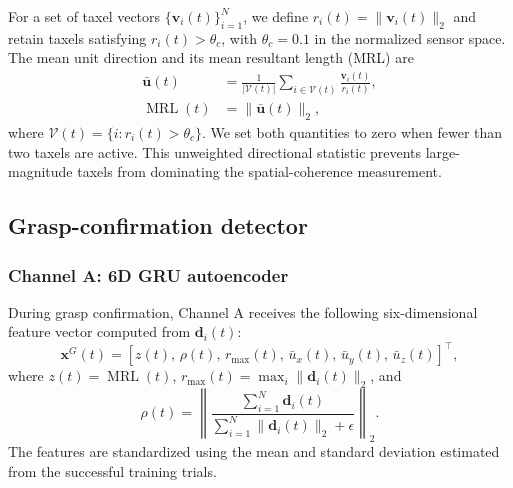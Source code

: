 For a set of taxel vectors $\{\mathbf{v}_i(t)\}_{i=1}^{N}$, we define
$r_i(t)=\|\mathbf{v}_i(t)\|_2$ and retain taxels satisfying
$r_i(t)>\theta_c$, with $\theta_c=0.1$ in the normalized sensor space. The mean
unit direction and its mean resultant length (MRL) are
%
\begin{align}
    \bar{\mathbf{u}}(t)
    &=
    \frac{1}{|\mathcal{V}(t)|}
    \sum_{i\in\mathcal{V}(t)}
    \frac{\mathbf{v}_i(t)}{r_i(t)},                                     
    \label{eq:mean_unit_direction}\\
    \operatorname{MRL}(t)
    &=\|\bar{\mathbf{u}}(t)\|_2,
    \label{eq:implemented_mrl}
\end{align}
%
where $\mathcal{V}(t)=\{i:r_i(t)>\theta_c\}$. We set both quantities to zero
when fewer than two taxels are active. This unweighted directional statistic
prevents large-magnitude taxels from dominating the spatial-coherence
measurement.

\subsection{Grasp-confirmation detector}
\label{sec:grasp_detector}

\subsubsection{Channel A: 6D GRU autoencoder}

During grasp confirmation, Channel A receives the following six-dimensional
feature vector computed from $\mathbf{d}_i(t)$:
%
\begin{equation}
    \mathbf{x}^{G}(t)
    =
    \left[
    z(t),\,
    \rho(t),\,
    r_{\max}(t),\,
    \bar{u}_x(t),\,
    \bar{u}_y(t),\,
    \bar{u}_z(t)
    \right]^\top ,
    \label{eq:grasp_6d}
\end{equation}
%
where $z(t)=\operatorname{MRL}(t)$,
$r_{\max}(t)=\max_i\|\mathbf{d}_i(t)\|_2$, and
%
\begin{equation}
    \rho(t)
    =
    \left\|
    \frac{\sum_{i=1}^{N}\mathbf{d}_i(t)}
         {\sum_{i=1}^{N}\|\mathbf{d}_i(t)\|_2+\epsilon}
    \right\|_2 .
    \label{eq:grasp_resultant_ratio}
\end{equation}
%
The features are standardized using the mean and standard deviation estimated
from the successful training trials.

